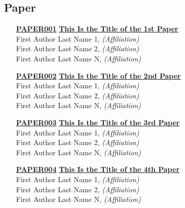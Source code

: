 
\subsection{Paper}
\begin{enumerate}
\item[\href{https://doi.org/10.1145/1122445.1122456}{\textbf{PAPER001}}]
\href{https://doi.org/10.1145/1122445.1122456}{\textbf{This Is the Title of the 1st Paper}}\\
First Author Last Name 1, \emph{(Affiliation)}\\
First Author Last Name 2, \emph{(Affiliation)}\\
First Author Last Name N, \emph{(Affiliation)}\\

\item[\href{https://doi.org/10.1145/1122445.1122456}{\textbf{PAPER002}}]
\href{https://doi.org/10.1145/1122445.1122456}{\textbf{This Is the Title of the 2nd Paper}}\\
First Author Last Name 1, \emph{(Affiliation)}\\
First Author Last Name 2, \emph{(Affiliation)}\\
First Author Last Name N, \emph{(Affiliation)}\\

\item[\href{https://doi.org/10.1145/1122445.1122456}{\textbf{PAPER003}}]
\href{https://doi.org/10.1145/1122445.1122456}{\textbf{This Is the Title of the 3rd Paper}}\\
First Author Last Name 1, \emph{(Affiliation)}\\
First Author Last Name 2, \emph{(Affiliation)}\\
First Author Last Name N, \emph{(Affiliation)}\\

\item[\href{https://doi.org/10.1145/1122445.1122456}{\textbf{PAPER004}}]
\href{https://doi.org/10.1145/1122445.1122456}{\textbf{This Is the Title of the 4th Paper}}\\
First Author Last Name 1, \emph{(Affiliation)}\\
First Author Last Name 2, \emph{(Affiliation)}\\
First Author Last Name N, \emph{(Affiliation)}\\


\end{enumerate}
